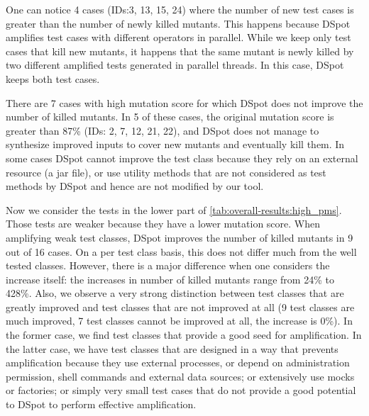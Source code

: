 \documentclass[table,xcdraw,smallextended]{svjour3}
\newcommand{\dspot}{DSpot\xspace}
\newcommand{\ms}{mutation score\xspace}
\begin{document}
One can notice 4 cases (IDs:3, 13, 15, 24) where the number of new test cases is greater than the number of newly killed mutants. This happens because \dspot{} amplifies test cases with different operators in parallel. While we keep only test cases that kill new mutants, it happens that the same mutant is newly killed by two different amplified tests generated in parallel threads. In this case, \dspot{} keeps both test cases.

There are 7 cases with high \ms for which \dspot{} does not improve the number of killed mutants. In 5 of these cases, the original \ms is greater than 87\% (IDs: 2, 7, 12, 21, 22), and \dspot{} does not manage to synthesize improved inputs to cover new mutants and eventually kill them. In some cases \dspot{} cannot improve the test class because they rely on an external resource (a jar file), or use utility methods that are not considered as test methods by \dspot and hence are not modified by our tool.

Now we consider the tests in the lower part of \autoref{tab:overall-results:high_pms}. %
Those tests are weaker because they have a lower \ms. 
When amplifying  weak test classes,  \dspot{} improves the number of killed mutants in  9 out of 16 cases. On a per test class basis, this does not differ much from the well tested classes. However, there is a major difference when one considers the increase itself: the increases in number of killed mutants range from 24\% to 428\%. Also, we observe a very strong distinction between test classes that are greatly improved and test classes that are not improved at all (9 test classes are much improved, 7 test classes cannot be improved at all, the increase is 0\%). In the former case, we find test classes that provide a good seed for amplification. In the latter case, we have test classes that are designed in a way that prevents amplification because they use external processes, or depend on administration permission, shell commands and external data sources; or extensively use mocks or factories; or simply very small test cases that do not provide a good potential to \dspot to perform effective amplification.
\end{document}
